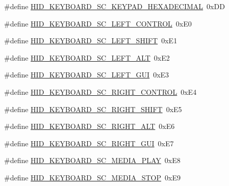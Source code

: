 \begin{DoxyCompactItemize}
\item 
\#define \hyperlink{group__Group__USBClassHIDCommon_gad44f6977eeb607f75637d94c038b2c13}{H\+I\+D\+\_\+\+K\+E\+Y\+B\+O\+A\+R\+D\+\_\+\+S\+C\+\_\+\+K\+E\+Y\+P\+A\+D\+\_\+\+H\+E\+X\+A\+D\+E\+C\+I\+M\+AL}~0x\+DD
\item 
\#define \hyperlink{group__Group__USBClassHIDCommon_gab8c9851d2bdede28ac1b74dd531ab5f2}{H\+I\+D\+\_\+\+K\+E\+Y\+B\+O\+A\+R\+D\+\_\+\+S\+C\+\_\+\+L\+E\+F\+T\+\_\+\+C\+O\+N\+T\+R\+OL}~0x\+E0
\item 
\#define \hyperlink{group__Group__USBClassHIDCommon_ga943b073f3be63a8e063e4d244b57ef3f}{H\+I\+D\+\_\+\+K\+E\+Y\+B\+O\+A\+R\+D\+\_\+\+S\+C\+\_\+\+L\+E\+F\+T\+\_\+\+S\+H\+I\+FT}~0x\+E1
\item 
\#define \hyperlink{group__Group__USBClassHIDCommon_ga7788457ae1c7a175708c6ea6bc624c3d}{H\+I\+D\+\_\+\+K\+E\+Y\+B\+O\+A\+R\+D\+\_\+\+S\+C\+\_\+\+L\+E\+F\+T\+\_\+\+A\+LT}~0x\+E2
\item 
\#define \hyperlink{group__Group__USBClassHIDCommon_ga549f73f6905d0d54dbbc2836df5e90f4}{H\+I\+D\+\_\+\+K\+E\+Y\+B\+O\+A\+R\+D\+\_\+\+S\+C\+\_\+\+L\+E\+F\+T\+\_\+\+G\+UI}~0x\+E3
\item 
\#define \hyperlink{group__Group__USBClassHIDCommon_ga98c8b97c662c8fafe24d6087065f7f09}{H\+I\+D\+\_\+\+K\+E\+Y\+B\+O\+A\+R\+D\+\_\+\+S\+C\+\_\+\+R\+I\+G\+H\+T\+\_\+\+C\+O\+N\+T\+R\+OL}~0x\+E4
\item 
\#define \hyperlink{group__Group__USBClassHIDCommon_ga32122dff4f317da3528c4de650be190c}{H\+I\+D\+\_\+\+K\+E\+Y\+B\+O\+A\+R\+D\+\_\+\+S\+C\+\_\+\+R\+I\+G\+H\+T\+\_\+\+S\+H\+I\+FT}~0x\+E5
\item 
\#define \hyperlink{group__Group__USBClassHIDCommon_gaf53b0fea0e1afd8380a55763fedac8ee}{H\+I\+D\+\_\+\+K\+E\+Y\+B\+O\+A\+R\+D\+\_\+\+S\+C\+\_\+\+R\+I\+G\+H\+T\+\_\+\+A\+LT}~0x\+E6
\item 
\#define \hyperlink{group__Group__USBClassHIDCommon_gacc3d658318171bb54bdbe2d10e8feb56}{H\+I\+D\+\_\+\+K\+E\+Y\+B\+O\+A\+R\+D\+\_\+\+S\+C\+\_\+\+R\+I\+G\+H\+T\+\_\+\+G\+UI}~0x\+E7
\item 
\#define \hyperlink{group__Group__USBClassHIDCommon_gaeb213b563f0a1db0a30b720353d201e9}{H\+I\+D\+\_\+\+K\+E\+Y\+B\+O\+A\+R\+D\+\_\+\+S\+C\+\_\+\+M\+E\+D\+I\+A\+\_\+\+P\+L\+AY}~0x\+E8
\item 
\#define \hyperlink{group__Group__USBClassHIDCommon_ga19cf94a5a2add090b1e9610071b6cf68}{H\+I\+D\+\_\+\+K\+E\+Y\+B\+O\+A\+R\+D\+\_\+\+S\+C\+\_\+\+M\+E\+D\+I\+A\+\_\+\+S\+T\+OP}~0x\+E9
\item 

\end{DoxyCompactItemize}
